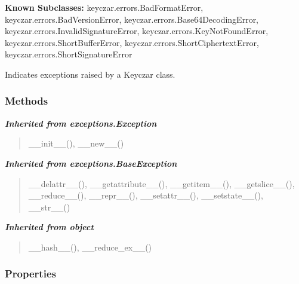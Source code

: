 \textbf{Known Subclasses:}
keyczar.errors.BadFormatError,
    keyczar.errors.BadVersionError,
    keyczar.errors.Base64DecodingError,
    keyczar.errors.InvalidSignatureError,
    keyczar.errors.KeyNotFoundError,
    keyczar.errors.ShortBufferError,
    keyczar.errors.ShortCiphertextError,
    keyczar.errors.ShortSignatureError

Indicates exceptions raised by a Keyczar class.



  \subsubsection{Methods}


\large{\textbf{\textit{Inherited from exceptions.Exception}}}

\begin{quote}
\_\_init\_\_(), \_\_new\_\_()
\end{quote}

\large{\textbf{\textit{Inherited from exceptions.BaseException}}}

\begin{quote}
\_\_delattr\_\_(), \_\_getattribute\_\_(), \_\_getitem\_\_(), \_\_getslice\_\_(), \_\_reduce\_\_(), \_\_repr\_\_(), \_\_setattr\_\_(), \_\_setstate\_\_(), \_\_str\_\_()
\end{quote}

\large{\textbf{\textit{Inherited from object}}}

\begin{quote}
\_\_hash\_\_(), \_\_reduce\_ex\_\_()
\end{quote}


  \subsubsection{Properties}

